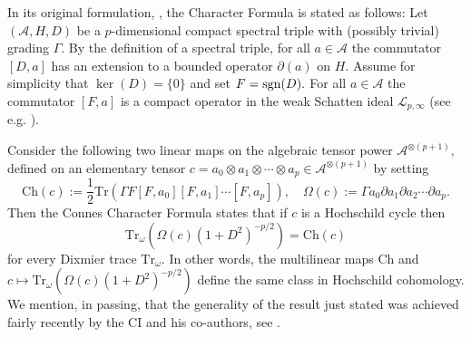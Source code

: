 \documentclass[12pt]{article}
\begin{document}
In its original formulation, \cite{Connes-original-spectral-1995}, the Character Formula is stated as follows: Let $(\mathcal{A},H,D)$ be a $p$-dimensional compact spectral triple     with (possibly trivial) grading $\Gamma.$ By the definition of a spectral triple, for all $a \in \mathcal{A}$ the commutator $[D,a]$ has an extension to a bounded operator $\partial(a)$ on $H.$ Assume for simplicity that $\ker(D)=\{0\}$ and set $F={\rm sgn}(D).$ For all $a \in \mathcal{A}$ the commutator $[F,a]$ is a compact operator in the weak Schatten ideal $\mathcal{L}_{p,\infty}$ (see e.g. \cite{Connes-book, book}).

Consider the following two linear maps on the algebraic tensor power $\mathcal{A}^{\otimes(p+1)},$ defined on an elementary tensor $c = a_0\otimes a_1\otimes \cdots \otimes a_p \in \mathcal{A}^{\otimes(p+1)}$ by setting
$$\mathrm{Ch}(c) := \frac{1}{2}\mathrm{Tr}(\Gamma F[F,a_0][F,a_1]\cdots[F,a_p]),\quad \Omega(c) := \Gamma a_0\partial a_1\partial a_2\cdots \partial a_p.$$
Then the Connes Character Formula states that if $c$ is a Hochschild cycle then
\begin{equation*}
\mathrm{Tr}_\omega(\Omega(c)(1+D^2)^{-p/2}) = \mathrm{Ch}(c)
\end{equation*}
for every Dixmier trace $\mathrm{Tr}_\omega$. In other words, the multilinear maps $\mathrm{Ch}$ and $c \mapsto \mathrm{Tr}_\omega(\Omega(c)(1+D^2)^{-p/2})$ define the same class in Hochschild cohomology. We mention, in passing, that the generality of the result just stated was achieved fairly recently by the CI and his co-authors, see \cite{CRSZ}.
    
\end{document}
